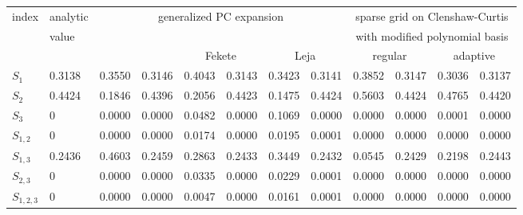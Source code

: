 
\begin{table}[!ht]
  \fontsize{8pt}{3ex}\selectfont
  \renewcommand{\arraystretch}{1.2}
  \begin{tabularx}{\textwidth}{XXXXXXXXXXXX}
    \toprule
    index &
    analytic &
    \multicolumn{6}{c}{generalized PC expansion} &
    \multicolumn{4}{c}{sparse grid on Clenshaw-Curtis} \\
    &
    value &
    & & & & & &
    \multicolumn{4}{c}{with modified polynomial basis} \\
    \hline
    & &
    \multicolumn{2}{c}{\citet{Sudret08Global}} &
    \multicolumn{2}{c}{Fekete} &
    \multicolumn{2}{c}{Leja} &
    \multicolumn{2}{c}{regular} &
    \multicolumn{2}{c}{adaptive} \\
    \toprule
    $S_1$ & 0.3138 & 0.3550 & 0.3146 & 0.4043 & 0.3143 & 0.3423 & 0.3141 & 0.3852 & 0.3147 & 0.3036 & 0.3137 \\
    $S_2$ & 0.4424 & 0.1846 & 0.4396 & 0.2056 & 0.4423 & 0.1475 & 0.4424 & 0.5603 & 0.4424 & 0.4765 & 0.4420 \\
    $S_3$ & 0 & 0.0000 & 0.0000 & 0.0482 & 0.0000 & 0.1069 & 0.0000 & 0.0000 & 0.0000 & 0.0001 & 0.0000 \\
    $S_{1, 2}$ & 0 & 0.0000 & 0.0000 & 0.0174 & 0.0000 & 0.0195 & 0.0001 & 0.0000 & 0.0000 & 0.0000 & 0.0000 \\
    $S_{1, 3}$ & 0.2436 & 0.4603 & 0.2459 & 0.2863 & 0.2433 & 0.3449 & 0.2432 & 0.0545 & 0.2429 & 0.2198 & 0.2443 \\
    $S_{2, 3}$ & 0 & 0.0000 & 0.0000 & 0.0335 & 0.0000 & 0.0229 & 0.0001 & 0.0000 & 0.0000 & 0.0000 & 0.0000 \\
    $S_{1, 2, 3}$ & 0 & 0.0000 & 0.0000 & 0.0047 & 0.0000 & 0.0161 & 0.0001 & 0.0000 & 0.0000 & 0.0000 & 0.0000 \\
    \hline


\end{tabularx}
\end{table}
